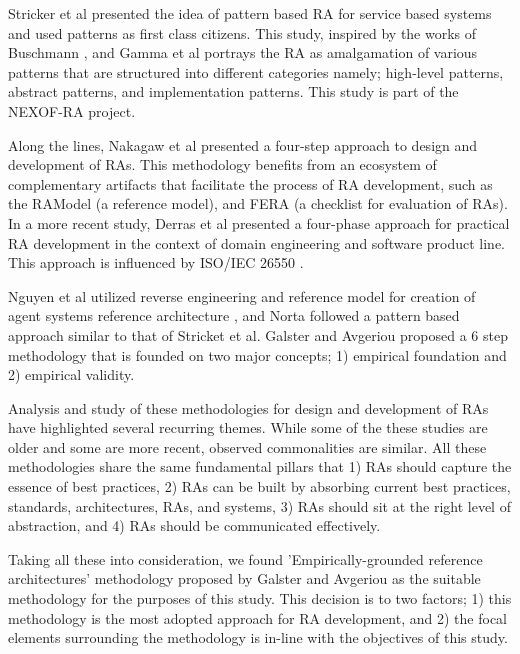 \documentclass[runningheads]{llncs}
\begin{document}
Stricker et al \cite{stricker2010creating} presented the idea of pattern based RA for service based systems and used patterns as first class citizens. This study, inspired by the works of Buschmann \cite{buschmann1996pattern}, and Gamma et al \cite{gamma1995design} portrays the RA as amalgamation of various patterns that are structured into different categories namely; high-level patterns, abstract patterns, and implementation patterns. This study is part of the NEXOF-RA \cite{birukounexof} project. 

Along the lines, Nakagaw et al \cite{nakagawa2014consolidating} presented a four-step approach to design and development of RAs. This methodology benefits from an ecosystem of complementary artifacts that facilitate the process of RA development, such as the RAModel \cite{nakagawa2012ramodel} (a reference model), and FERA \cite{santos2013checklist} (a checklist for evaluation of RAs). In a more recent study, Derras et al \cite{Derras} presented a four-phase approach for practical RA development in the context of domain engineering and software product line. This approach is influenced by ISO/IEC 26550 \cite{wg2015iso}.

Nguyen et al utilized reverse engineering and reference model for creation of agent systems reference architecture \cite{nguyen2010methodology}, and Norta \cite{norta2006developing} followed a pattern based approach similar to that of Stricket et al. Galster and Avgeriou \cite{GALSTER} proposed a 6 step methodology that is founded on two major concepts; 1) empirical foundation and 2) empirical validity.

Analysis and study of these methodologies for design and development of RAs have highlighted several recurring themes. While some of the these studies are older and some are more recent, observed commonalities are similar. All these methodologies share the same fundamental pillars that 1) RAs should capture the essence of best practices, 2) RAs can be built by absorbing current best practices, standards, architectures, RAs, and systems, 3) RAs should sit at the right level of abstraction, and 4) RAs should be communicated effectively. 

Taking all these into consideration, we found 'Empirically-grounded reference architectures' methodology proposed by Galster and Avgeriou as the suitable methodology for the purposes of this study. This decision is to two factors; 1) this methodology is the most adopted approach for RA development, and 2) the focal elements surrounding the methodology is in-line with the objectives of this study. 
\end{document}
